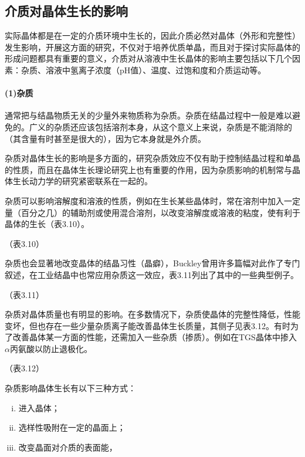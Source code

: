\subsection{介质对晶体生长的影响}
实际晶体都是在一定的介质环境中生长的，因此介质必然对晶体（外形和完整性）发生影响，开展这方面的研究，不仅对于培养优质单晶，而且对于探讨实际晶体的形成问题都具有重要的意义，介质对从溶液中生长晶体的影响主要包括以下几个因素：杂质、溶液中氢离子浓度（pH值）、温度、过饱和度和介质运动等。

\paragraph{(1)杂质}通常把与结晶物质无关的少量外来物质称为杂质。杂质在结晶过程中一般是难以避免的。广义的杂质还应该包括溶剂本身，从这个意义上来说，杂质是不能消除的（其含量有时甚至是很大的），因为它本身就是外介质。

杂质对晶体生长的影响是多方面的，研究杂质效应不仅有助于控制结晶过程和单晶的性质，而且在晶体生长理论研究上也有重要的作用，因为杂质影响的机制常与晶体生长动力学的研究紧密联系在一起的。

杂质可以影响溶解度和溶液的性质，例如在生长某些晶体时，常在溶剂中加入一定量（百分之几）的辅助剂或使用混合溶剂，以改变溶解度或溶液的粘度，使有利于晶体的生长（表3.10）。

（表3.10）

杂质也会显著地改变晶体的结晶习性（晶癖），Buckley曾用许多篇幅对此作了专门叙述，在工业结晶中也常应用杂质这一效应，表3.11列出了其中的一些典型例子。

（表3.11）

杂质对晶体质量也有明显的影响。在多数情况下，杂质使晶体的完整性降低，性能变坏，但也存在一些少量杂质离子能改善晶体生长质量，其侧子见表3.12。有时为了改善晶体某一方面的性能，还需加入一些杂质（掺质）。例如在TGS晶体中掺入$\alpha$丙氨酸以防止退极化。

（表3.12）

杂质影响晶体生长有以下三种方式：
\begin{enumerate}[(i)]\itemsep -0.5ex
\item 进入晶体；
\item 选样性吸附在一定的晶面上；
\item 改变晶面对介质的表面能，
\end{enumerate}

